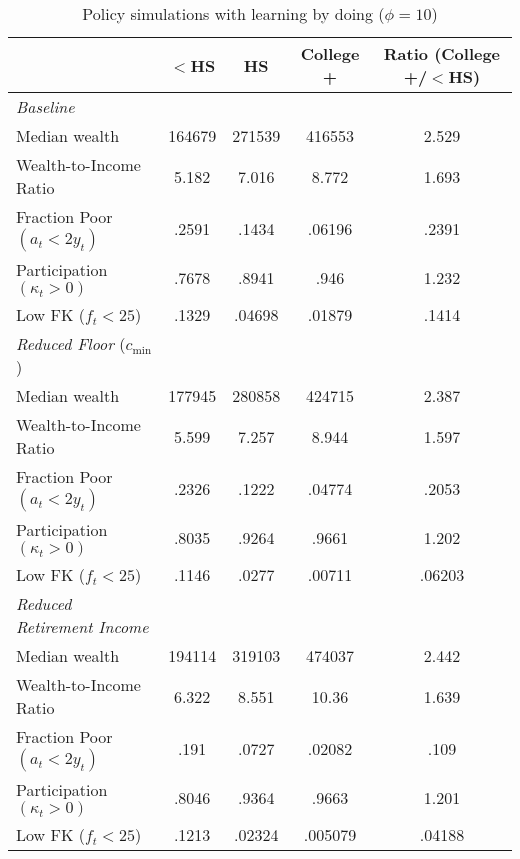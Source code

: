 \documentclass[10pt, oneside]{article}   	%
\begin{document}
\begin{table}[H]
\centering
\begin{tabular}{lcccc} \hline \hline
 & $<$HS  & HS  & College +  & Ratio (College +/$<$HS)  \\  \hline 
\textit{Baseline} &          &          &          &          \\ 
Median wealth &    164679 &    271539 &    416553 &     2.529 \\  
Wealth-to-Income Ratio  &     5.182 &     7.016 &     8.772 &     1.693 \\  
Fraction Poor $(a_t<2y_t)$&     .2591 &     .1434 &    .06196 &     .2391 \\  
Participation $(\kappa_t>0)$ &     .7678 &     .8941 &      .946 &     1.232 \\  
Low FK ($f_t<25$) &     .1329 &    .04698 &    .01879 &     .1414 \\ 
\hline
\textit{Reduced Floor} ($c_{\min}$) &          &          &          &          \\  
Median wealth &    177945 &    280858 &    424715 &     2.387 \\  
Wealth-to-Income Ratio  &     5.599 &     7.257 &     8.944 &     1.597 \\  
Fraction Poor $(a_t<2y_t)$ &     .2326 &     .1222 &    .04774 &     .2053 \\  
Participation $(\kappa_t>0)$ &     .8035 &     .9264 &     .9661 &     1.202 \\  
Low FK ($f_t<25$)&     .1146 &     .0277 &    .00711 &    .06203 \\  
\hline
\textit{Reduced Retirement Income} &          &          &          &          \\  
Median wealth &    194114 &    319103 &    474037 &     2.442 \\  
Wealth-to-Income Ratio &     6.322 &     8.551 &     10.36 &     1.639 \\  
Fraction Poor $(a_t<2y_t)$ &      .191 &     .0727 &    .02082 &      .109 \\  
Participation $(\kappa_t>0)$ &     .8046 &     .9364 &     .9663 &     1.201 \\  
Low FK ($f_t<25$) &     .1213 &    .02324 &   .005079 &    .04188 \\  
\hline \hline \end{tabular}
\caption{Policy simulations with learning by doing ($\phi = 10$)}
\end{table}

\pagebreak
\end{document}
